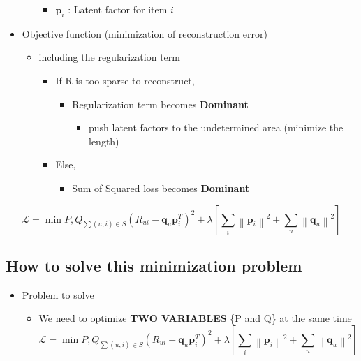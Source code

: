 \documentclass[11pt]{article}
\providecommand{\tightlist}{%
      \setlength{\itemsep}{0pt}\setlength{\parskip}{0pt}}
\begin{document}
\begin{itemize}
\begin{itemize}
    \begin{itemize}
    \tightlist
    \item
      \(\mathbf{p}_i\) : Latent factor for item \(i\)
    \end{itemize}
  \end{itemize}
\item
  Objective function (minimization of reconstruction error)

  \begin{itemize}
  \tightlist
  \item
    including the regularization term

    \begin{itemize}
    \tightlist
    \item
      If R is too sparse to reconstruct,

      \begin{itemize}
      \tightlist
      \item
        Regularization term becomes \textbf{Dominant}

        \begin{itemize}
        \tightlist
        \item
          push latent factors to the undetermined area (minimize the
          length)
        \end{itemize}
      \end{itemize}
    \item
      Else,

      \begin{itemize}
      \tightlist
      \item
        Sum of Squared loss becomes \textbf{Dominant}
      \end{itemize}
    \end{itemize}
  \end{itemize}
\end{itemize}

\[
\mathcal{L} = \min{P, Q}_{\sum{(u, i) \in S}} (R_{ui} - \mathbf{q}_u\mathbf{p}_i^T)^2 + \lambda [\sum_i{\left\lVert \mathbf{p}_i \right\rVert}^2 + \sum_u{\left\lVert \mathbf{q}_u \right\rVert}^2]
\]

    \hypertarget{how-to-solve-this-minimization-problem}{%
\subsection{How to solve this minimization
problem}\label{how-to-solve-this-minimization-problem}}

\begin{itemize}
\tightlist
\item
  Problem to solve

  \begin{itemize}
  \tightlist
  \item
    We need to optimize \textbf{TWO VARIABLES} \{P and Q\} at the same
    time \[
    \mathcal{L} = \min{P, Q}_{\sum{(u, i) \in S}} (R_{ui} - \mathbf{q}_u\mathbf{p}_i^T)^2 + \lambda [\sum_i{\left\lVert \mathbf{p}_i \right\rVert}^2 + \sum_u{\left\lVert \mathbf{q}_u \right\rVert}^2]
    \]
  \end{itemize}
\end{itemize}
\end{document}
